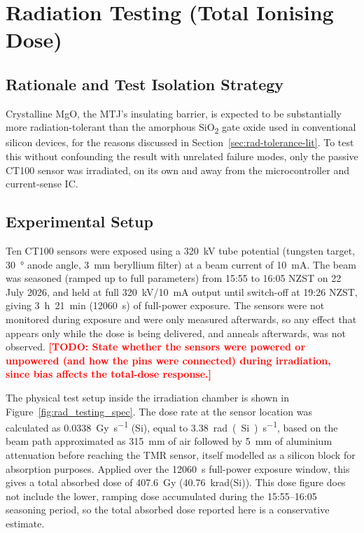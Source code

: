\documentclass[12pt,a4paper]{article}
\newcommand{\todo}[1]{\textcolor{red}{\textbf{[TODO: #1]}}}
\begin{document}
\section{Radiation Testing (Total Ionising Dose)}
\label{sec:radiation-testing}

\subsection{Rationale and Test Isolation Strategy}
\label{sec:rad-rationale}

Crystalline MgO, the MTJ's insulating barrier, is expected to be substantially more radiation-tolerant than the amorphous SiO\textsubscript{2} gate oxide used in conventional silicon devices, for the reasons discussed in Section~\ref{sec:rad-tolerance-lit}. To test this without confounding the result with unrelated failure modes, only the passive CT100 sensor was irradiated, on its own and away from the microcontroller and current-sense IC.


\subsection{Experimental Setup}
\label{sec:rad-setup}

Ten CT100 sensors were exposed using a \SI{320}{\kilo\volt} tube potential (tungsten target, \SI{30}{\degree} anode angle, \SI{3}{\milli\metre} beryllium filter) at a beam current of \SI{10}{\milli\ampere}. The beam was seasoned (ramped up to full parameters) from 15:55 to 16:05 NZST on 22 July 2026, and held at full \SI{320}{\kilo\volt}/\SI{10}{\milli\ampere} output until switch-off at 19:26 NZST, giving \SI{3}{\hour}~\SI{21}{\minute} (\SI{12060}{\second}) of full-power exposure. The sensors were not monitored during exposure and were only measured afterwards, so any effect that appears only while the dose is being delivered, and anneals afterwards, was not observed. \todo{State whether the sensors were powered or unpowered (and how the pins were connected) during irradiation, since bias affects the total-dose response.}

The physical test setup inside the irradiation chamber is shown in Figure~\ref{fig:rad_testing_spec}. The dose rate at the sensor location was calculated as \SI{0.0338}{\gray\per\second} (Si), equal to \SI{3.38}{rad(Si)\per\second}, based on the beam path approximated as \SI{315}{\milli\metre} of air followed by \SI{5}{\milli\metre} of aluminium attenuation before reaching the TMR sensor, itself modelled as a silicon block for absorption purposes. Applied over the \SI{12060}{\second} full-power exposure window, this gives a total absorbed dose of \SI{407.6}{\gray} (\SI{40.76}{\kilo rad}(Si)). This dose figure does not include the lower, ramping dose accumulated during the 15:55--16:05 seasoning period, so the total absorbed dose reported here is a conservative estimate.
\end{document}
